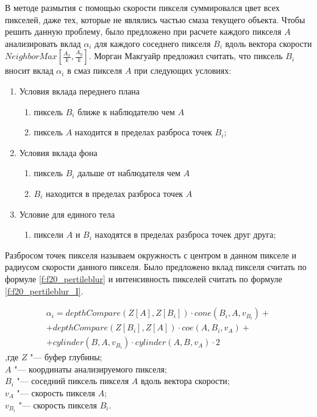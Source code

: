 В методе размытия с помощью скорости пикселя суммировался цвет всех пикселей, даже тех, которые не являлись частью смаза текущего объекта. Чтобы решить данную проблему, было предложено при расчете каждого пикселя $A$ анализировать вклад $\alpha_i$ для каждого соседнего пикселя $B_i$ вдоль  вектора скорости $NeighborMax[\frac{A_x}{k}, \frac{A_y}{k}]$. Морган Макгуайр предложил считать, что пиксель $B_i$ вносит вклад $\alpha_i$ в смаз пикселя $A$ при следующих условиях:
\begin{enumerate}
    \item Условия вклада переднего плана
          \begin{enumerate}
              \item пиксель $B_i$ ближе к наблюдателю чем $A$
              \item пиксель $A$ находится в пределах разброса точек $B_i$;
          \end{enumerate}
    \item Условия вклада фона
          \begin{enumerate}
              \item пиксель $B_i$ дальше от наблюдателя чем $A$
              \item $B_i$ находится в пределах разброса точек $A$
          \end{enumerate}
    \item Условие для единого тела
          \begin{enumerate}
              \item пиксели $A$ и $B_i$ находятся в пределах разброса точек друг друга;
          \end{enumerate}
\end{enumerate}


Разбросом точек пикселя называем окружность с центром в данном пикселе и радиусом скорости данного пикселя. Было предложено вклад пикселя считать по формуле \eqref{f:f20_pertileblur} и интенсивность пикселей считать по формуле \eqref{f:f20_pertileblur_I}.
\begin{eqndesc}
    \begin{eqnarray}
        \label{f:f20_pertileblur}
        \alpha_i =
        depthCompare(Z[A], Z[B_i]) \cdot cone(B_i, A, v_{B_i}) + \\
        + depthCompare(Z[B_i], Z[A]) \cdot coe(A, B_i, v_A) + \\
        + cylinder(B,A,v_{B_i}) \cdot cylinder(A,B, v_A) \cdot 2
    \end{eqnarray}
    ,где
    $Z$ "--- буфер глубины; \\
    $A$ "--- координаты анализируемого пикселя; \\
    $B_i$ "--- соседний пиксель пикселя $A$ вдоль вектора скорости; \\ 
    $v_A$ "--- скорость пикселя $A$; \\
    $v_{B_i}$ "--- скорость пикселя $B_i$. \\

\end{eqndesc}
\par 

